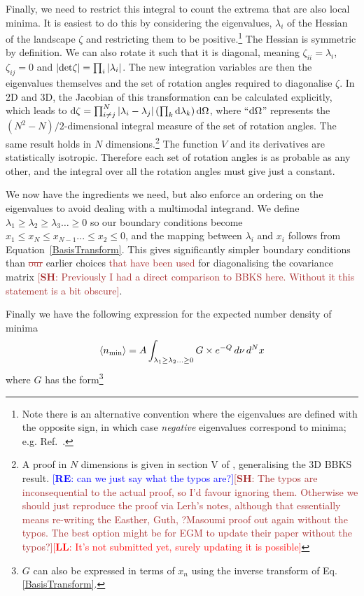 \documentclass[12pt]{article}
\newcommand{\re}[1]{\textcolor{blue}{[{\bf RE}: #1]}}
\newcommand{\lfl}[1]{\textcolor{red}{[{\bf LL}: #1]}}
\newcommand{\SH}[1]{\textcolor{brown}{[{\bf SH}: #1]}}
\newcommand{\sh}[1]{\textcolor{brown}{#1}}
\begin{document}
Finally, we need to restrict this integral to count the extrema that are also local minima. It is easiest to do this by considering the eigenvalues, $\lambda_i$ of the Hessian of the landscape $\zeta$ and restricting them to be positive.\footnote{Note there is an alternative convention where the eigenvalues are defined with the opposite sign, in which case \emph{negative} eigenvalues correspond to minima; e.g. Ref.~\cite{BBKS}.}  The Hessian is symmetric by definition. We can also rotate it such that it is diagonal, meaning  $\zeta_{ii}=\lambda_i$, $\zeta_{ij}=0$ and $|{\rm det} \zeta| = \prod_i |\lambda_i|$. The new integration variables are then the eigenvalues themselves and the set of rotation angles required to diagonalise $\zeta$.  In 2D and 3D, the Jacobian of this transformation can be calculated explicitly, which leads to  ${\rm d} \zeta = \prod_{i \neq j}^N |\lambda_i - \lambda_j|\left(\prod_k {\rm d}\lambda_k\right) {\rm d} \Omega$, where ``${\rm d}\Omega$'' represents the $(N^2-N)/2$-dimensional integral measure of the set of rotation angles. The same result holds in $N$ dimensions.\footnote{A proof in $N$ dimensions is given in section V of \cite{Easther2016}, generalising the 3D  BBKS result. \re{can we just say what the typos are?}\SH{The typos are inconsequential to the actual proof, so I'd favour ignoring them. Otherwise we should just reproduce the proof via Lerh's notes, although that essentially means re-writing the Easther, Guth, ?Masoumi proof out again without the typos. The best option might be for EGM to update their paper without the typos?}\lfl{It's not submitted yet, surely updating it is possible}} The function $V$ and its derivatives are statistically isotropic. Therefore each set of rotation angles is as probable as any other, and the integral over all the rotation angles must give just a constant.

We now have  the ingredients we  need, but  also enforce an ordering on the eigenvalues to avoid dealing with a multimodal integrand.  We define  $\lambda_1 \geq \lambda_2 \geq \lambda_3 \ldots \geq 0$ so our boundary conditions become $x_1\leq x_N\leq x_{N-1} ... \leq x_2 \leq 0$, and the mapping between $\lambda_i$ and $x_i$  follows from Equation~\ref{BasisTransform}. This gives significantly simpler boundary conditions than \sh{\sout{our}} earlier choices \sh{that have been used} for diagonalising the covariance matrix \SH{Previously I had a direct comparison to BBKS here. Without it this statement is a bit obscure}.

Finally we have the following expression for the expected number density of minima 
%
\begin{equation} \label{DensityOfPeaks}
\langle n_{{\rm min}} \rangle = A \int_{\lambda_1 \geq \lambda_2 \ldots \geq 0} G \times e^{-Q} \, d\nu \,d^Nx
\end{equation}
%
\noindent where $G$ has the form\footnote{$G$ can also be expressed in terms of $x_n$ using the inverse transform of Eq. \ref{BasisTransform}.}
\end{document}
